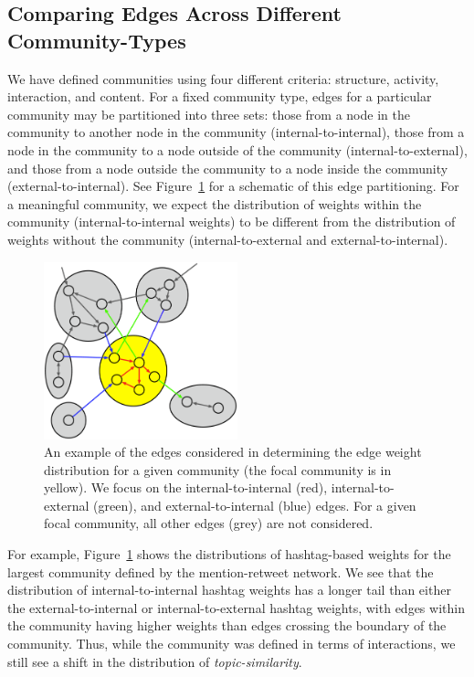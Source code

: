 \subsection{Comparing Edges Across Different Community-Types}

We have defined communities using four different criteria: structure, activity, interaction, and content. For a fixed community type, edges for a particular community may be partitioned into three sets: those from a node in the community to another node in the community (internal-to-internal), those from a node in the community to a node outside of the community (internal-to-external), and those from a node outside the community to a node inside the community (external-to-internal). See Figure~\ref{Fig-edge_types} for a schematic of this edge partitioning. For a meaningful community, we expect the distribution of weights within the community (internal-to-internal weights) to be different from the distribution of weights without the community (internal-to-external and external-to-internal).

\begin{figure}[h!]
  \centering
\includegraphics[width=0.50\textwidth]{figures/edge-types.eps}
\caption{An example of the edges considered in determining the edge weight distribution for a given community (the focal community is in yellow). We focus on the internal-to-internal (red), internal-to-external (green), and external-to-internal (blue) edges. For a given focal community, all other edges (grey) are not considered.}
\label{Fig-edge_types}
\end{figure}

For example, Figure~\ref{Fig-edge_types} shows the distributions of hashtag-based weights for the largest community defined by the mention-retweet network. We see that the distribution of internal-to-internal hashtag weights has a longer tail than either the external-to-internal or internal-to-external hashtag weights, with edges within the community having higher weights than edges crossing the boundary of the community. Thus, while the community was defined in terms of interactions, we still see a shift in the distribution of \emph{topic-similarity}.

